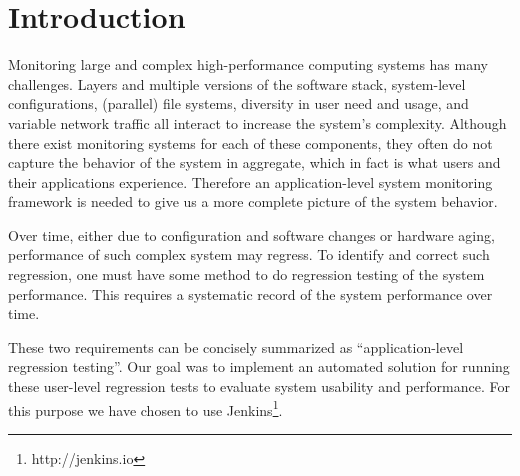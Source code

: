 \documentclass[10pt, conference, compsocconf]{IEEEtran}
\begin{document}


%
\IEEEpeerreviewmaketitle

\section{Introduction}
\label{sec:introduction}

Monitoring large and complex high-performance computing systems has many challenges. 
Layers and multiple versions of the software stack, system-level configurations, (parallel) file systems, diversity in user need and usage, and variable network traffic all interact to increase the system's complexity. 
Although there exist monitoring systems for each of these components, they often do not capture the behavior of the system in aggregate, which in fact is what users and their applications experience. 
Therefore an application-level system monitoring framework is needed to give us a more complete picture of the system behavior. 
 

Over time, either due to configuration and software changes or hardware aging, performance of such complex system may regress. 
To identify and correct such regression, one must have some method to do regression testing of the system performance. 
This requires a systematic record of the system performance over time.

These two requirements can be concisely summarized as ``application-level regression testing''. 
Our goal was to implement an automated solution for running these user-level regression tests to evaluate system usability and performance. 
For this purpose we have chosen to use Jenkins\footnote{http://jenkins.io}.
\end{document}
